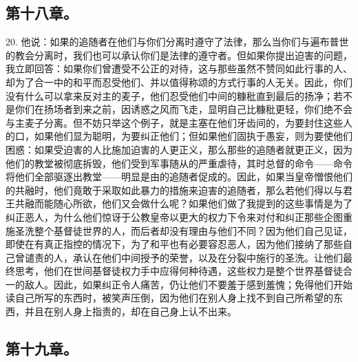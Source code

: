 
\subsection{第十八章。}

20. 他说：如果的追随者在他们与你们分离时遵守了法律，那么当你们与遍布普世的教会分离时，我们也可以承认你们是法律的遵守者。但如果你提出迫害的问题，我立即回答：如果你们曾遭受不公正的对待，这与那些虽然不赞同如此行事的人、却为了合一中的和平而忍受他们、并以值得称颂的方式行事的人无关。因此，你们没有什么可以拿来反对主的麦子，他们忍受他们中间的糠秕直到最后的扬净；若不是你们在扬场者到来之前，因诱惑之风而飞走，显明自己比糠秕更轻，你们绝不会与主麦子分离。但不妨只举这个例子，就是主塞在他们牙齿间的，为要封住这些人的口，如果他们显为聪明，为要纠正他们；但如果他们固执于愚妄，则为要使他们困惑：如果受迫害的人比施加迫害的人更正义，那么那些的追随者就更正义，因为他们的教堂被彻底拆毁，他们受到军事随从的严重虐待，其时总督的命令——命令将他们全部驱逐出教堂——明显是由的追随者促成的。因此，如果当皇帝憎恨他们的共融时，他们竟敢于采取如此暴力的措施来迫害的追随者，那么若他们得以与君王共融而能随心所欲，他们又会做什么呢？如果他们做了我提到的这些事情是为了纠正恶人，为什么他们惊讶于公教皇帝以更大的权力下令来对付和纠正那些企图重施圣洗整个基督徒世界的人，而后者却没有理由与他们不同？因为他们自己见证，即使在有真正指控的情况下，为了和平也有必要容忍恶人，因为他们接纳了那些自己曾谴责的人，承认在他们中间授予的荣誉，以及在分裂中施行的圣洗。让他们最终思考，他们在世间基督徒权力手中应得何种待遇，这些权力是整个世界基督徒合一的敌人。因此，如果纠正令人痛苦，仍让他们不要羞于感到羞愧；免得他们开始读自己所写的东西时，被笑声压倒，因为他们在别人身上找不到自己所希望的东西，并且在别人身上指责的，却在自己身上认不出来。\par


\subsection{第十九章。}

